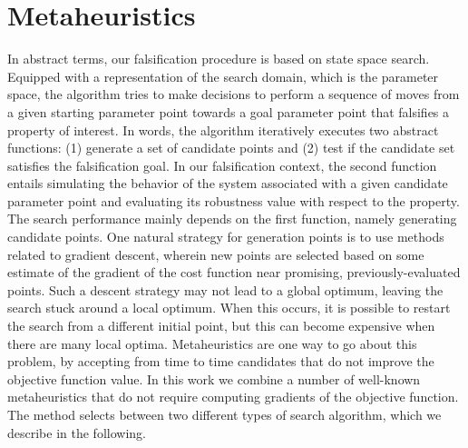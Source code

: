 \section{Metaheuristics}\label{Solvers}
In abstract terms, our falsification procedure is based on state space search. Equipped with a representation of the search domain, which is the parameter space, the algorithm tries to make decisions to perform a sequence of moves from a given starting parameter point towards a goal parameter point that falsifies a property of interest. In words, the algorithm iteratively executes two abstract functions: (1) generate a set of candidate points and (2) test if the candidate set satisfies the falsification goal. In our falsification context, the second function entails simulating the behavior of the system associated with a given candidate parameter point and evaluating its robustness value with respect to the property. The search performance mainly depends on the first function, namely generating candidate points. 
One natural strategy for generation points is to use methods related to gradient descent, wherein new points are selected based on some estimate of the gradient of the cost function near promising, previously-evaluated points.
Such a descent strategy may not lead to a global optimum, leaving the search stuck around a local optimum. 
When this occurs, it is possible to restart the search from a different initial point, but this can become expensive when there are many local optima. Metaheuristics \cite{dreo:hal-01341683} are one way to go about this problem, by accepting from time to time candidates that do not improve the objective function value. In this work we combine a number of well-known metaheuristics that do not require computing gradients of the objective function. The method 
selects between two different types of search algorithm, which we describe in the following. %


